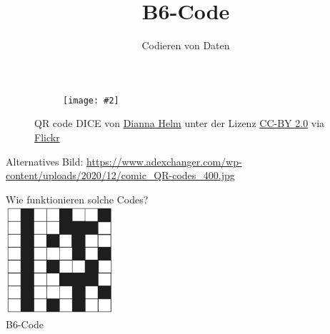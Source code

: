 \documentclass{beamer}
\title{B6-Code}
\subtitle{Codieren von Daten}
\date{}
\makeatletter
\newcommand{\fitimage}[2][\@nil]{
  \begin{figure}
    \begin{adjustbox}{width=0.9\textwidth, totalheight=\textheight-2\baselineskip-2\baselineskip,keepaspectratio}
      \texttt{[image: \#2]}
    \end{adjustbox}
    \def\tmp{#1}%
   \ifx\tmp\@nnil
      \else
      \caption{#1}
    \fi
  \end{figure}
}
\makeatother
\begin{document}
\frame{\titlepage}

\begin{frame}
	\begin{figure}
    \centering
    \fitimage{5515626016_1a37c22695_c.jpg}
    \small{QR code DICE von \href{https://flickr.com/photos/marketrumba/}{Dianna Helm} unter der Lizenz \href{https://creativecommons.org/licenses/by/2.0/}{CC-BY 2.0} via \href{https://flickr.com/photos/marketrumba/5515626016/in/photolist-9pp2sh-bcdB5a-9uBSzB-9ns3Qb-5UEYNb-rLo6vW-efsAmU-2kKiRUZ-bhzmXe-2ozHt2Q-2ozGbeW-8NkYm7-2oARGMA-2ozJWRp-dZMsHs-2ozJx9b-7B2LMV-7PTnYd-acpiyT-a9Wk32-9m9eds-5tpEfb-2ozJZw4-dxyZQZ-9XJh81-9m9e7Y-2ozDf6R-65a4tp-5qsA45-9m9eau-adXWea-asmcJi-9fEV63-2mP9Fsr-8xAJxS-9TiyD3-7YYLbH-em3z1w-9q1yKt-dYnSL5-8crU4j-9fEUMG-81QJNR-ccQ6rL-oZ8zTh-2hSBXaf-2ozDf5i-2mQAthB-ajNoNY-AEx5nZ}{Flickr}}
	\end{figure}
  \tiny{Alternatives Bild: \url{https://www.adexchanger.com/wp-content/uploads/2020/12/comic_QR-codes_400.jpg}}
\end{frame}

\begin{frame}
  \centering
  \huge
  Wie funktionieren solche Codes?
  \\
  \vspace{0.5cm}
  \includegraphics[width=0.3\textwidth]{./b6code-internet.excalidraw.png}
  \\
  \huge
  B6-Code
\end{frame}
\end{document}
